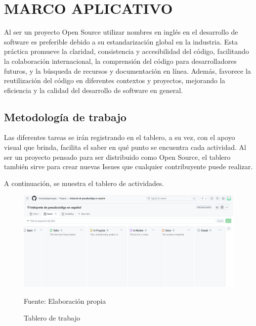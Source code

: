\chapter{MARCO APLICATIVO}

Al ser un proyecto Open Source utilizar nombres en inglés en el desarrollo de software es preferible debido a su estandarización global en la industria. Esta práctica promueve la claridad, consistencia y accesibilidad del código, facilitando la colaboración internacional, la comprensión del código para desarrolladores futuros, y la búsqueda de recursos y documentación en línea. Además, favorece la reutilización del código en diferentes contextos y proyectos, mejorando la eficiencia y la calidad del desarrollo de software en general.

\section{Metodología de trabajo}
Las diferentes tareas se irán registrando en el tablero, a su vez, con el apoyo visual que brinda, facilita el saber en qué punto se encuentra cada actividad. Al ser un proyecto pensado para ser distribuido como Open Source, el tablero también sirve para crear nuevas Issues que cualquier contribuyente puede realizar.

A continuación, se muestra el tablero de actividades.
\begin{figure}[!h]
  \centering
  \includegraphics[width=1\textwidth]{images/tablero.png}
  \caption{Tablero de trabajo}
  \centering Fuente: Elaboración propia
  \label{fig:tablero}
\end{figure}
\newline
\newline
\newline

